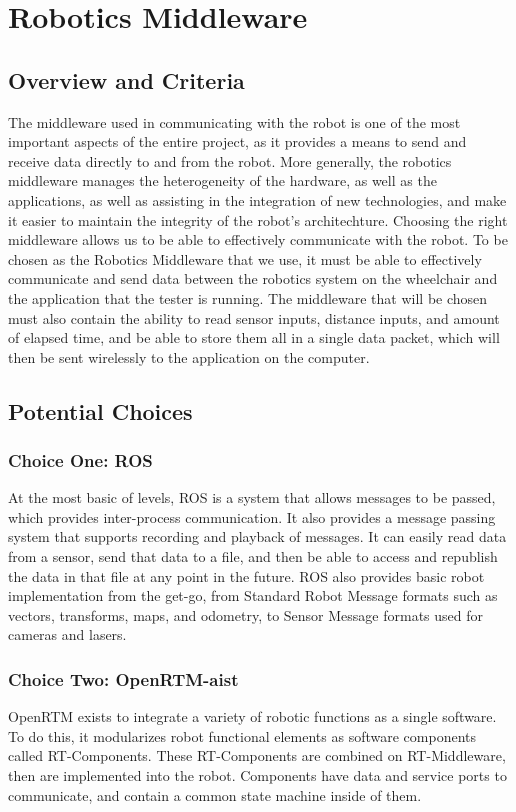 \documentclass[onecolumn, draftclsnofoot,10pt, compsoc]{IEEEtran}
\begin{document}
\section{Robotics Middleware}
\subsection{Overview and Criteria}
The middleware used in communicating with the robot is one of the most important aspects of the entire project, as it provides a means to send and receive data directly to and from the robot. More generally, the robotics middleware manages the heterogeneity of the hardware, as well as the applications, as well as assisting in the integration of new technologies, and make it easier to maintain the integrity of the robot's architechture.\cite{Robotics_Middleware} Choosing the right middleware allows us to be able to effectively communicate with the robot. To be chosen as the Robotics Middleware that we use, it must be able to effectively communicate and send data between the robotics system on the wheelchair and the application that the tester is running. The middleware that will be chosen must also contain the ability to read sensor inputs, distance inputs, and amount of elapsed time, and be able to store them all in a single data packet, which will then be sent wirelessly to the application on the computer.

\subsection{Potential Choices}

\subsubsection{Choice One: ROS}
At the most basic of levels, ROS is a system that allows messages to be passed, which provides inter-process communication. It also provides a message passing system that supports recording and playback of messages. It can easily read data from a sensor, send that data to a file, and then be able to access and republish the data in that file at any point in the future. ROS also provides basic robot implementation from the get-go, from Standard Robot Message formats such as vectors, transforms, maps, and odometry, to Sensor Message formats used for cameras and lasers.\cite{ROS_Core}

\subsubsection{Choice Two: OpenRTM-aist}
OpenRTM exists to integrate a variety of robotic functions as a single software. To do this, it modularizes robot functional elements as software components called RT-Components. These RT-Components are combined on RT-Middleware, then are implemented into the robot. Components have data and service ports to communicate, and contain a common state machine inside of them.\cite{OpenRTM_Info}
\end{document}
